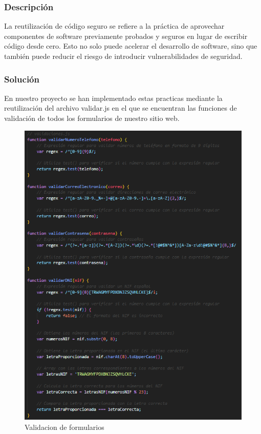 \documentclass{report}
\begin{document}
                \subsubsection{Descripción}
                    La reutilización de código seguro se refiere a la práctica de aprovechar componentes de software previamente probados y seguros en lugar de escribir código desde cero. Esto no solo puede acelerar el desarrollo de software, sino que también puede reducir el riesgo de introducir vulnerabilidades de seguridad.
                \subsubsection{Solución}
                    En nuestro proyecto se han implementado estas practicas mediante la reutilización del archivo validar.js en el que se encuentran las funciones de validación de todos los formularios de nuestro sitio web.
                    \begin{figure}[H]
                        \centering
                        \includegraphics[width=\textwidth]{./img/vulnerabilidades/3.4/1.1.png}
                        \caption{Validacion de formularios}
                    \end{figure}
            \clearpage
\end{document}
